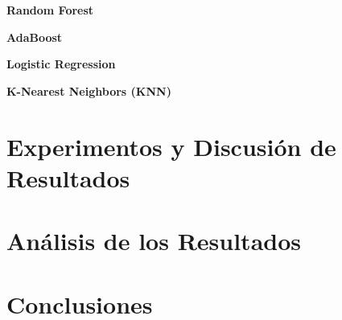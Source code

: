 \documentclass[12pt,a4paper]{article}
\begin{document}
{{            \textbf{Random Forest}\\
            {
                
            }

            \textbf{AdaBoost}\\
            {
                
            }

            \textbf{Logistic Regression}\\
            {
                
            }

            \textbf{K-Nearest Neighbors (KNN)}\\
            {
                
            }
        }
    }
    \newpage

    \section{Experimentos y Discusión de Resultados}
    {}
    \newpage

    \section{Análisis de los Resultados}
    {}
    \newpage

    \section{Conclusiones}
    {}
    \newpage

    \printbibliography[heading=bibintoc,title={Referencias Bibliográficas}]
\end{document}
